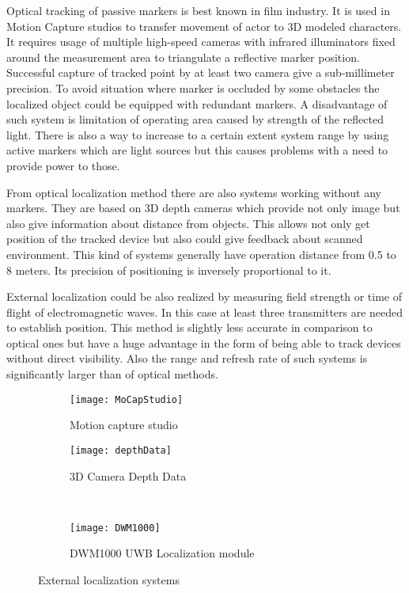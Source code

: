 \documentclass[printmode,en]{mgr}
\begin{document}
Optical tracking of passive markers \cite{MoCap} is best known in film industry. It is used in Motion Capture studios to transfer movement of actor to 3D modeled characters. It requires usage of multiple high-speed cameras with infrared illuminators fixed around the measurement area to triangulate a reflective marker position. Successful capture of tracked point by at least two camera give a sub-millimeter precision. To avoid situation where marker is occluded by some obstacles the localized object could be equipped with redundant markers. A disadvantage of such system is limitation of operating area caused by strength of the reflected light. There is also a way to increase to a certain extent system range by using active markers which are light sources but this causes problems with a need to provide power to those.

From optical localization method there are also systems working without any markers. They are based on 3D depth cameras which provide not only image but also give information about distance from objects. This allows not only get position of the tracked device but also could give feedback about scanned environment. This kind of systems generally have operation distance from 0.5 to 8 meters. Its precision of positioning is inversely proportional to it.

External localization could be also realized by measuring field strength or time of flight of electromagnetic waves. In this case at least three transmitters are needed to establish position. This method is slightly less accurate in comparison to optical ones but have a huge advantage in the form of being able to track devices without direct visibility. Also the range and refresh rate of such systems is significantly larger than of optical methods.

\begin{figure}[!ht]
\centering
\begin{subfigure}{.45\textwidth}
  \centering
  \texttt{[image: MoCapStudio]}
  \caption{Motion capture studio \cite{MoCapStudio}}
  \label{fig:MoCapStudio}
\end{subfigure}
\begin{subfigure}{.45\textwidth}
  \centering
  \texttt{[image: depthData]}
  \caption{3D Camera Depth Data \cite{depthData}}
  \label{fig:depthData}
\end{subfigure}\\
\begin{subfigure}{.5\textwidth}
  \centering
  \texttt{[image: DWM1000]}
  \caption{DWM1000 UWB Localization module \cite{DWM1000}}
  \label{fig:DWM1000}
\end{subfigure}
\caption{External localization systems}
\label{fig:externalDevicesLocalization}
\end{figure}
\end{document}
